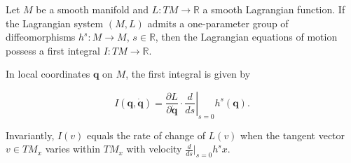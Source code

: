Let $M$ be a smooth manifold and $L: TM \to \mathbb{R}$ a smooth Lagrangian function. If the Lagrangian system $(M, L)$ admits a one-parameter group of diffeomorphisms $h^s: M \to M$, $s \in \mathbb{R}$, then the Lagrangian equations of motion possess a first integral $I: TM \to \mathbb{R}$.

In local coordinates $\mathbf{q}$ on $M$, the first integral is given by

$$I(\mathbf{q}, \dot{\mathbf{q}}) = \frac{\partial L}{\partial \dot{\mathbf{q}}} \cdot \left. \frac{d}{ds} \right|_{s=0} h^s(\mathbf{q}).$$

Invariantly, $I(v)$ equals the rate of change of $L(v)$ when the tangent vector $v \in TM_x$ varies within $TM_x$ with velocity $\frac{d}{ds}\big|_{s=0} h^s x$.
